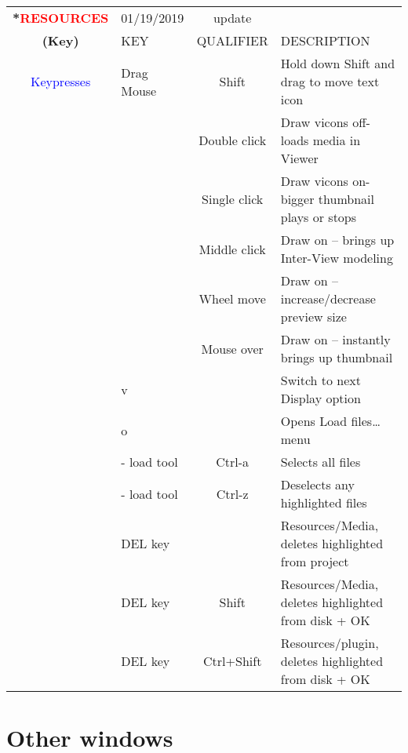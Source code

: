 \begin{center}
    \small 
    \begin{longtable}{ >{\bfseries}c l c p{6cm}}             
        \toprule
        \multirow{2}*{\textcolor{red}{RESOURCES}} & 01/19/2019 & update & \\
        \noalign{\smallskip}
        \cline{2-4}
        \noalign{\smallskip}
        (Key) & KEY & QUALIFIER & DESCRIPTION\\
        \midrule        
        \endhead   
        
        \textcolor{blue}{Keypresses} & Drag Mouse & Shift & Hold down Shift and drag to move text icon \\                
        &  & Double click & Draw vicons off- loads media in Viewer \\        
        &  & Single click & Draw vicons on- bigger thumbnail plays or stops \\        
        &  & Middle click & Draw on -- brings up Inter-View modeling \\        
        &  & Wheel move & Draw on – increase/decrease preview size \\        
        &  & Mouse over & Draw on – instantly brings up thumbnail \\        
        & v &  & Switch to next Display option \\        
        & o &  & Opens Load files\dots menu \\        
        & - load tool & Ctrl-a & Selects all files \\        
        & - load tool & Ctrl-z & Deselects any highlighted files \\        
        & DEL key &  & Resources/Media, deletes highlighted from project \\        
        & DEL key & Shift & Resources/Media, deletes highlighted from disk + OK \\        
        & DEL key & Ctrl+Shift & Resources/plugin, deletes highlighted from disk + OK \\
        
        
        \bottomrule  
    \end{longtable}
\end{center} 

\section{Other windows }%
\label{sec:other_windows}

